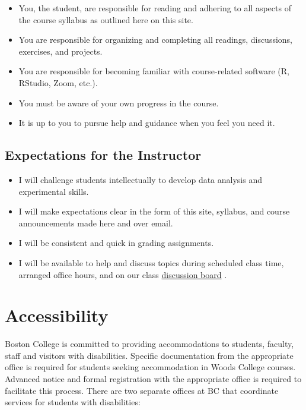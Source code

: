 \documentclass[
]{article}
\providecommand{\tightlist}{%
  \setlength{\itemsep}{0pt}\setlength{\parskip}{0pt}}
\begin{document}
\begin{itemize}
\tightlist
\item
  You, the student, are responsible for reading and adhering to all
  aspects of the course syllabus as outlined here on this site.
\item
  You are responsible for organizing and completing all readings,
  discussions, exercises, and projects.
\item
  You are responsible for becoming familiar with course-related software
  (R, RStudio, Zoom, etc.).
\item
  You must be aware of your own progress in the course.
\item
  It is up to you to pursue help and guidance when you feel you need it.
\end{itemize}

\hypertarget{expectations-for-the-instructor}{%
\subsection{Expectations for the
Instructor}\label{expectations-for-the-instructor}}

\begin{itemize}
\tightlist
\item
  I will challenge students intellectually to develop data analysis and
  experimental skills.
\item
  I will make expectations clear in the form of this site, syllabus, and
  course announcements made here and over email.
\item
  I will be consistent and quick in grading assignments.
\item
  I will be available to help and discuss topics during scheduled class
  time, arranged office hours, and on our class
  \href{https://github.com/orgs/bcbiomech/teams/biol-5380}{discussion
  board} .
\end{itemize}

\hypertarget{accessibility}{%
\section{Accessibility}\label{accessibility}}

Boston College is committed to providing accommodations to students,
faculty, staff and visitors with disabilities. Specific documentation
from the appropriate office is required for students seeking
accommodation in Woods College courses. Advanced notice and formal
registration with the appropriate office is required to facilitate this
process. There are two separate offices at BC that coordinate services
for students with disabilities:
\end{document}
